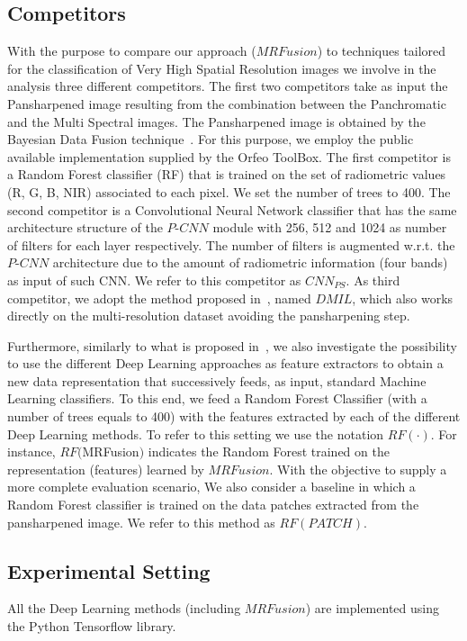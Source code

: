 \documentclass[journal]{IEEEtran}
\newcommand{\method}{$MRFusion$}
\begin{document}
\subsection{Competitors}
With the purpose to compare our approach (\method{}) to techniques tailored for the classification of Very High Spatial Resolution images we involve in the analysis three different competitors. The first two competitors take as input the Pansharpened image resulting from the combination between the Panchromatic and the Multi Spectral images. The Pansharpened image is obtained by the Bayesian Data Fusion technique~\cite{4505280}. For this purpose, we employ the public available implementation supplied by the Orfeo ToolBox\cite{Grizonnet2017}. The first competitor is a  Random Forest classifier (RF) that is trained on the set of radiometric values (R, G, B, NIR) associated to each pixel. We set the number of trees to 400. The second competitor is a Convolutional Neural Network classifier that has the same architecture structure of the $P$-$CNN$ module with 256, 512 and 1024 as number of filters for each layer respectively. The number of filters is augmented w.r.t. the $P$-$CNN$ architecture due to the amount of radiometric information (four bands) as input of such CNN. We refer to this competitor as $CNN_{PS}$. As third competitor, we adopt the method proposed in~\cite{LiuJZZZLYT18}, named $DMIL$, which also works directly on the multi-resolution dataset avoiding the pansharpening step.

Furthermore, similarly to what is proposed in~\cite{IencoGDM17}, we also investigate the possibility to use the different Deep Learning approaches as feature extractors to obtain a new data representation that successively feeds, as input, standard Machine Learning classifiers. To this end, we feed a Random Forest Classifier (with a number of trees equals to 400) with the features extracted by each of the different Deep Learning methods. To refer to this setting we use the notation $RF(\cdot)$. For instance, $RF(\method)$ indicates the Random Forest trained on the representation (features) learned by \method{}. With the objective to supply a more complete evaluation scenario, We also consider a baseline in which a Random Forest classifier is trained on the data patches extracted from the pansharpened image. We refer to this method as $RF(PATCH)$.

\subsection{Experimental Setting}
All the Deep Learning methods (including \method{}) are implemented using the Python Tensorflow library.
\end{document}
